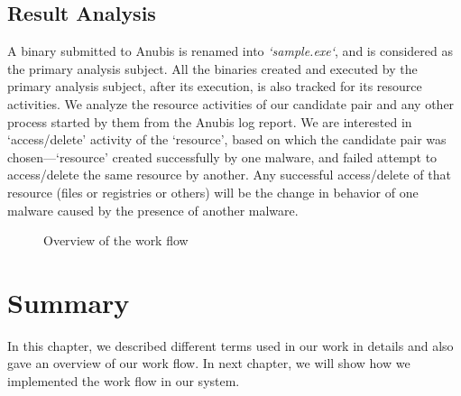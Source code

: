 \subsection{Result Analysis}
\label{sub:Result Analysis}
A binary submitted to Anubis is renamed into \emph{`sample.exe`}, and is considered as the primary analysis subject.
All the binaries created and executed by the primary analysis subject, after its execution, is also tracked for its resource activities.
We analyze the resource activities of our candidate pair and any other process started by them from the Anubis log report.
We are interested in `access/delete' activity of the `resource', based on which the candidate pair was chosen---`resource' created successfully by one malware, and failed attempt to access/delete the same resource by another.
Any successful access/delete of that resource (files or registries or others) will be the change in behavior of one malware caused by the presence of another malware.

\begin{figure}[ht]
    \centering
    \def\svgwidth{\columnwidth}
    \scalebox{0.7}{}
\caption{Overview of the work flow}
\label{fig:bigpicture}
\label{fig:overview}
\end{figure}

\section{Summary}
\label{sec:ssummary}
In this chapter, we described different terms used in our work in details and also gave an overview of our work flow.
In next chapter, we will show how we implemented the work flow in our system.
